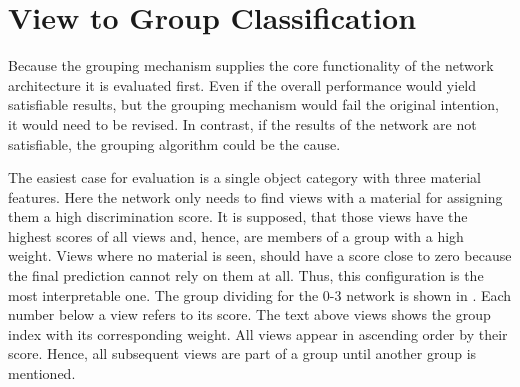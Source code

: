 \section{View to Group Classification}
\label{sec:results-grouping}
Because the grouping mechanism supplies the core functionality of the network architecture it is evaluated first.
Even if the overall performance would yield satisfiable results, but the grouping mechanism would fail the original intention, it would need to be revised.
In contrast, if the results of the network are not satisfiable, the grouping algorithm could be the cause.

The easiest case for evaluation is a single object category with three material features.
Here the network only needs to find views with a material for assigning them a high discrimination score.
It is supposed, that those views have the highest scores of all views and, hence, are members of a group with a high weight.
Views where no material is seen, should have a score close to zero because the final prediction cannot rely on them at all.
Thus, this configuration is the most interpretable one.
The group dividing for the 0-3 network is shown in .
Each number below a view refers to its score.
The text above views shows the group index with its corresponding weight.
All views appear in ascending order by their score.
Hence, all subsequent views are part of a group until another group is mentioned.
